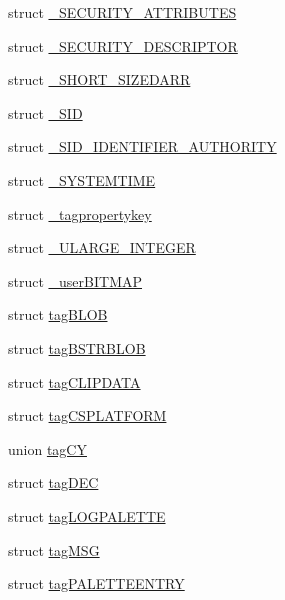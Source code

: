 \begin{DoxyCompactItemize}
\item 
struct \hyperlink{struct_i_win_types_1_1___s_e_c_u_r_i_t_y___a_t_t_r_i_b_u_t_e_s}{\+\_\+\+S\+E\+C\+U\+R\+I\+T\+Y\+\_\+\+A\+T\+T\+R\+I\+B\+U\+T\+ES}
\item 
struct \hyperlink{struct_i_win_types_1_1___s_e_c_u_r_i_t_y___d_e_s_c_r_i_p_t_o_r}{\+\_\+\+S\+E\+C\+U\+R\+I\+T\+Y\+\_\+\+D\+E\+S\+C\+R\+I\+P\+T\+OR}
\item 
struct \hyperlink{struct_i_win_types_1_1___s_h_o_r_t___s_i_z_e_d_a_r_r}{\+\_\+\+S\+H\+O\+R\+T\+\_\+\+S\+I\+Z\+E\+D\+A\+RR}
\item 
struct \hyperlink{struct_i_win_types_1_1___s_i_d}{\+\_\+\+S\+ID}
\item 
struct \hyperlink{struct_i_win_types_1_1___s_i_d___i_d_e_n_t_i_f_i_e_r___a_u_t_h_o_r_i_t_y}{\+\_\+\+S\+I\+D\+\_\+\+I\+D\+E\+N\+T\+I\+F\+I\+E\+R\+\_\+\+A\+U\+T\+H\+O\+R\+I\+TY}
\item 
struct \hyperlink{struct_i_win_types_1_1___s_y_s_t_e_m_t_i_m_e}{\+\_\+\+S\+Y\+S\+T\+E\+M\+T\+I\+ME}
\item 
struct \hyperlink{struct_i_win_types_1_1__tagpropertykey}{\+\_\+tagpropertykey}
\item 
struct \hyperlink{struct_i_win_types_1_1___u_l_a_r_g_e___i_n_t_e_g_e_r}{\+\_\+\+U\+L\+A\+R\+G\+E\+\_\+\+I\+N\+T\+E\+G\+ER}
\item 
struct \hyperlink{struct_i_win_types_1_1__user_b_i_t_m_a_p}{\+\_\+user\+B\+I\+T\+M\+AP}
\item 
struct \hyperlink{struct_i_win_types_1_1tag_b_l_o_b}{tag\+B\+L\+OB}
\item 
struct \hyperlink{struct_i_win_types_1_1tag_b_s_t_r_b_l_o_b}{tag\+B\+S\+T\+R\+B\+L\+OB}
\item 
struct \hyperlink{struct_i_win_types_1_1tag_c_l_i_p_d_a_t_a}{tag\+C\+L\+I\+P\+D\+A\+TA}
\item 
struct \hyperlink{struct_i_win_types_1_1tag_c_s_p_l_a_t_f_o_r_m}{tag\+C\+S\+P\+L\+A\+T\+F\+O\+RM}
\item 
union \hyperlink{struct_i_win_types_1_1tag_c_y}{tag\+CY}
\item 
struct \hyperlink{struct_i_win_types_1_1tag_d_e_c}{tag\+D\+EC}
\item 
struct \hyperlink{struct_i_win_types_1_1tag_l_o_g_p_a_l_e_t_t_e}{tag\+L\+O\+G\+P\+A\+L\+E\+T\+TE}
\item 
struct \hyperlink{struct_i_win_types_1_1tag_m_s_g}{tag\+M\+SG}
\item 
struct \hyperlink{struct_i_win_types_1_1tag_p_a_l_e_t_t_e_e_n_t_r_y}{tag\+P\+A\+L\+E\+T\+T\+E\+E\+N\+T\+RY}

\end{DoxyCompactItemize}
